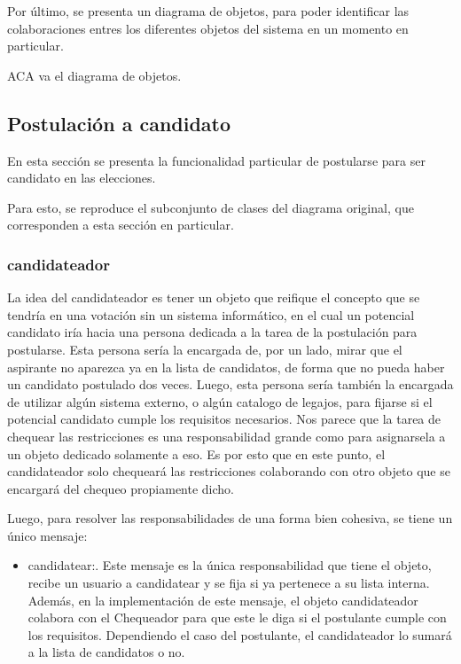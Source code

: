 Por \'ultimo, se presenta un diagrama de objetos, para poder identificar las colaboraciones entres los diferentes objetos del sistema en un momento en particular.

ACA va el diagrama de objetos.





\subsection{Postulaci\'on a candidato}

En esta secci\'on se presenta la funcionalidad particular de postularse para ser candidato en las elecciones.


Para esto, se reproduce el subconjunto de clases del diagrama original, que corresponden a esta secci\'on en particular.




\subsubsection{candidateador}

La idea del candidateador es tener un objeto que reifique el concepto que se tendr\'ia en una votaci\'on sin un sistema inform\'atico, en el cual un potencial candidato ir\'ia hacia una persona dedicada a la tarea de la postulaci\'on para postularse. Esta persona ser\'ia la encargada de, por un lado, mirar que el aspirante no aparezca ya en la lista de candidatos, de forma que no pueda haber un candidato postulado dos veces. Luego, esta persona ser\'ia tambi\'en la encargada de utilizar alg\'un sistema externo, o alg\'un catalogo de legajos, para fijarse si el potencial candidato cumple los requisitos necesarios. Nos parece que la tarea de chequear las restricciones es una responsabilidad grande como para asignarsela a un objeto dedicado solamente a eso. Es por esto que en este punto, el candidateador solo chequear\'a las restricciones colaborando con otro objeto que se encargar\'a del chequeo propiamente dicho.

Luego, para resolver las responsabilidades de una forma bien cohesiva, se tiene un \'unico mensaje:

\begin{itemize}
\item candidatear:. Este mensaje es la \'unica responsabilidad que tiene el objeto, recibe un usuario a candidatear y se fija si ya pertenece a su lista interna. Adem\'as, en la implementaci\'on de este mensaje, el objeto candidateador colabora con el Chequeador para que este le diga si el postulante cumple con los requisitos. Dependiendo el caso del postulante, el candidateador lo sumar\'a a la lista de candidatos o no.
\end{itemize}


